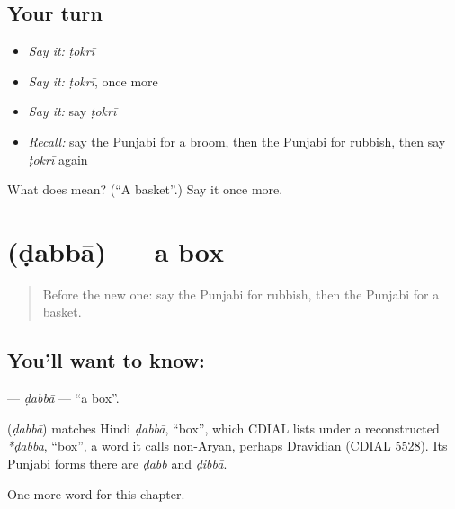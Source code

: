 \subsection*{Your turn}
\begin{itemize}
\raggedright
  \item \emph{Say it:} \emph{ṭokrī}
  \item \emph{Say it:} \emph{ṭokrī}, once more
  \item \emph{Say it:} say \emph{ṭokrī}
  \item \emph{Recall:} say the Punjabi for a broom, then the Punjabi for rubbish, then say \emph{ṭokrī} again
\end{itemize}

\begin{tcolorbox}[breakable,colback=teal!4,colframe=teal!35!black,title={Before you move on}]
What does  mean? (\textquotedblleft{}A basket\textquotedblright{}.) Say it once more.
\end{tcolorbox}
\section[\texorpdfstring{\pa{ਡੱਬਾ} (ḍabbā)}{ਡੱਬਾ (ḍabbā)}]{ (ḍabbā) — a box}

\label{lesson:PA-C117-dabba}



\begin{quote}
Before the new one: say the Punjabi for rubbish, then the Punjabi for a basket.
\end{quote}

\subsection*{You'll want to know: }
\textbf{} — \emph{ḍabbā} — \textquotedblleft{}a box\textquotedblright{}.

\begin{cousinweb}
\textbf{} (\emph{ḍabbā}) matches Hindi \emph{ḍabbā}, \textquotedblleft{}box\textquotedblright{}, which CDIAL lists under a reconstructed \emph{*ḍabba}, \textquotedblleft{}box\textquotedblright{}, a word it calls non-Aryan, perhaps Dravidian (CDIAL 5528). Its Punjabi forms there are \emph{ḍabb} and \emph{ḍibbā}.
\end{cousinweb}

\begin{grammarlens}[title={What you've built}]
One more word for this chapter.
\end{grammarlens}

